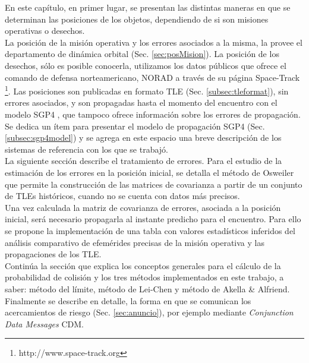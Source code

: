 En este cap\'itulo, en primer lugar, se presentan las distintas maneras en que se determinan las posiciones de los objetos, dependiendo de si son misiones operativas o desechos.\\
La posici\'on de la misi\'on operativa y los errores asociados a la misma, la provee el departamento de din\'amica orbital (Sec. \ref{sec:posMision}).
La posici\'on de los desechos, s\'olo es posible conocerla, utilizamos los datos p\'ublicos que ofrece el comando de defensa norteamericano, \ac{NORAD} a trav\'es de su p\'agina Space-Track {\footnote{http://www.space-track.org}}. Las posiciones son publicadas en formato \ac{TLE} (Sec. \ref{subsec:tleformat}), sin errores asociados, y son propagadas hasta el momento del encuentro con el modelo SGP4  \citep{hoots1980models}, que tampoco ofrece informaci\'on sobre los errores de propagaci\'on. Se dedica un \'item para presentar el modelo de propagaci\'on SGP4 (Sec. \ref{subsec:sgp4model}) y se agrega en este espacio una breve descripci\'on de los sistemas de referencia con los que se trabaj\'o.\\

La siguiente secci\'on describe el tratamiento de errores. Para el estudio de la estimaci\'on de los errores en la posici\'on inicial, se detalla el m\'etodo de Osweiler \citep{osweiler} que permite la construcci\'on de las matrices de covarianza a partir de un conjunto de TLEs hist\'oricos, cuando no se cuenta con datos m\'as precisos.\\

Una vez calculada la matriz de covarianza de errores, asociada a la posici\'on inicial, ser\'a necesario propagarla al instante predicho para el encuentro. Para ello se propone la implementaci\'on de una tabla con valores estad\'isticos inferidos del an\'alisis comparativo de efem\'erides precisas de la misi\'on operativa y las propagaciones de los TLE.\\

Contin\'ua la secci\'on que explica los conceptos generales para el c\'alculo de la probabilidad de colisi\'on y los tres m\'etodos implementados en este trabajo, a saber: m\'etodo del l\'imite, m\'etodo de Lei-Chen y m\'etodo de Akella \& Alfriend.\\

Finalmente se describe en detalle, la forma en que se comunican los acercamientos de riesgo (Sec. \ref{sec:anuncio}), por ejemplo mediante {\it{Conjunction Data Messages}} \ac{CDM}.


